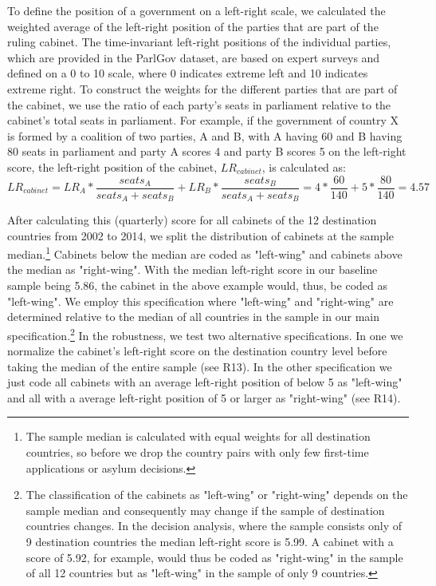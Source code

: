 \documentclass[11pt,a4paper]{scrartcl}
\begin{document}
To define the position of a government on a left-right scale, we calculated the weighted average of the left-right position of the parties that are part of the ruling cabinet. The time-invariant left-right positions of the individual parties, which are provided in the ParlGov dataset, are based on expert surveys and defined on a 0 to 10 scale, where 0 indicates extreme left and 10 indicates extreme right. To construct the weights for the different parties that are part of the cabinet, we use the ratio of each party's seats in parliament relative to the cabinet's total seats in parliament. For example, if the government of country X is formed by a coalition of two parties, A and B, with A having 60 and B having 80 seats in parliament and party A scores 4 and party B scores 5 on the left-right score, the left-right position of the cabinet, $LR_{cabinet}$, is calculated as: 
\begin{equation*}
LR_{cabinet} = LR_{A} * \frac{seats_{A}}{seats_{A} + seats_{B}} +LR_{B} * \frac{seats_{B}}{seats_{A} + seats_{B}} = 4*\frac{60}{140} +5*\frac{80}{140} = 4.57
\end{equation*}

After calculating this (quarterly) score for all cabinets of the 12 destination countries from 2002 to 2014, we split the distribution of cabinets at the sample median.\footnote{The sample median is calculated with equal weights for all destination countries, so before we drop the country pairs with only few first-time applications or asylum decisions.} Cabinets below the median are coded as "left-wing" and cabinets above the median as "right-wing". With the median left-right score in our baseline sample being 5.86, the cabinet in the above example would, thus, be coded as "left-wing". We employ this specification where "left-wing" and "right-wing" are determined relative to the median of all countries in the sample in our main specification.\footnote{The classification of the cabinets as "left-wing" or "right-wing" depends on the sample median and consequently may change if the sample of destination countries changes. In the decision analysis, where the sample consists only of 9 destination countries the median left-right score is 5.99. A cabinet with a score of 5.92, for example, would thus be coded as "right-wing" in the sample of all 12 countries but as "left-wing" in the sample of only 9 countries.} In the robustness, we test two alternative specifications. In one we normalize the cabinet's left-right score on the destination country level before taking the median of the entire sample (see R13). In the other specification we just code all cabinets with an average left-right position of below 5 as "left-wing" and all with a average left-right position of 5 or larger as "right-wing" (see R14).
\end{document}
